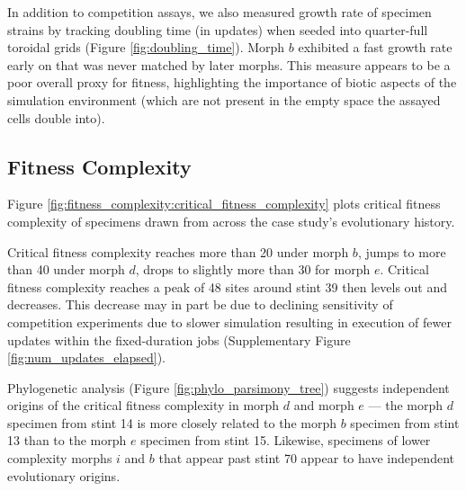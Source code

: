 

In addition to competition assays, we also measured growth rate of specimen strains by tracking doubling time (in updates) when seeded into quarter-full toroidal grids (Figure \ref{fig:doubling_time}).
Morph $b$ exhibited a fast growth rate early on that was never matched by later morphs.
This measure appears to be a poor overall proxy for fitness, highlighting the importance of biotic aspects of the simulation environment (which are not present in the empty space the assayed cells double into).


\subsection{Fitness Complexity}



Figure \ref{fig:fitness_complexity:critical_fitness_complexity} plots critical fitness complexity of specimens drawn from across the case study's evolutionary history.

Critical fitness complexity reaches more than 20 under morph $b$, jumps to more than 40 under morph $d$, drops to slightly more than 30 for morph $e$.
Critical fitness complexity reaches a peak of 48 sites around stint 39 then levels out and decreases.
This decrease may in part be due to declining sensitivity of competition experiments due to slower simulation resulting in execution of fewer updates within the fixed-duration jobs (Supplementary Figure \ref{fig:num_updates_elapsed}).

Phylogenetic analysis (Figure \ref{fig:phylo_parsimony_tree}) suggests independent origins of the critical fitness complexity in morph $d$ and morph $e$ --- the morph $d$ specimen from stint 14 is more closely related to the morph $b$ specimen from stint 13 than to the morph $e$ specimen from stint 15.
Likewise, specimens of lower complexity morphs $i$ and $b$ that appear past stint 70 appear to have independent evolutionary origins.



